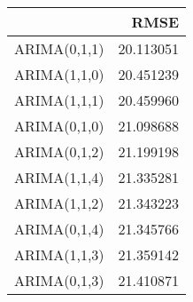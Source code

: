\begin{tabular}{lr}
\toprule
 & RMSE \\
\midrule
ARIMA(0,1,1) & 20.113051 \\
ARIMA(1,1,0) & 20.451239 \\
ARIMA(1,1,1) & 20.459960 \\
ARIMA(0,1,0) & 21.098688 \\
ARIMA(0,1,2) & 21.199198 \\
ARIMA(1,1,4) & 21.335281 \\
ARIMA(1,1,2) & 21.343223 \\
ARIMA(0,1,4) & 21.345766 \\
ARIMA(1,1,3) & 21.359142 \\
ARIMA(0,1,3) & 21.410871 \\
\bottomrule
\end{tabular}
